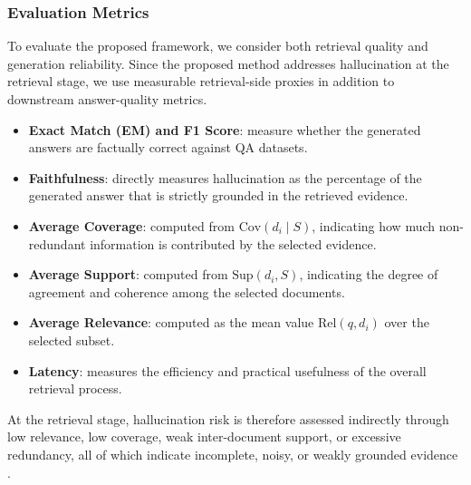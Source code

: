 \documentclass[conference]{IEEEtran}
\begin{document}
\subsubsection{Evaluation Metrics}

To evaluate the proposed framework, we consider both retrieval quality and generation reliability. Since the proposed method addresses hallucination at the retrieval stage, we use measurable retrieval-side proxies in addition to downstream answer-quality metrics.

\begin{itemize}
  \item \textbf{Exact Match (EM) and F1 Score}: measure whether the generated answers are factually correct against QA datasets.
  \item \textbf{Faithfulness}: directly measures hallucination as the percentage of the generated answer that is strictly grounded in the retrieved evidence.
  \item \textbf{Average Coverage}: computed from $\mathrm{Cov}(d_i \mid S)$, indicating how much non-redundant information is contributed by the selected evidence.
  \item \textbf{Average Support}: computed from $\mathrm{Sup}(d_i, S)$, indicating the degree of agreement and coherence among the selected documents.
  \item \textbf{Average Relevance}: computed as the mean value $\mathrm{Rel}(q, d_i)$ over the selected subset.
  \item \textbf{Latency}: measures the efficiency and practical usefulness of the overall retrieval process.
\end{itemize}

At the retrieval stage, hallucination risk is therefore assessed indirectly through low relevance, low coverage, weak inter-document support, or excessive redundancy, all of which indicate incomplete, noisy, or weakly grounded evidence \cite{3,8}.
\end{document}
